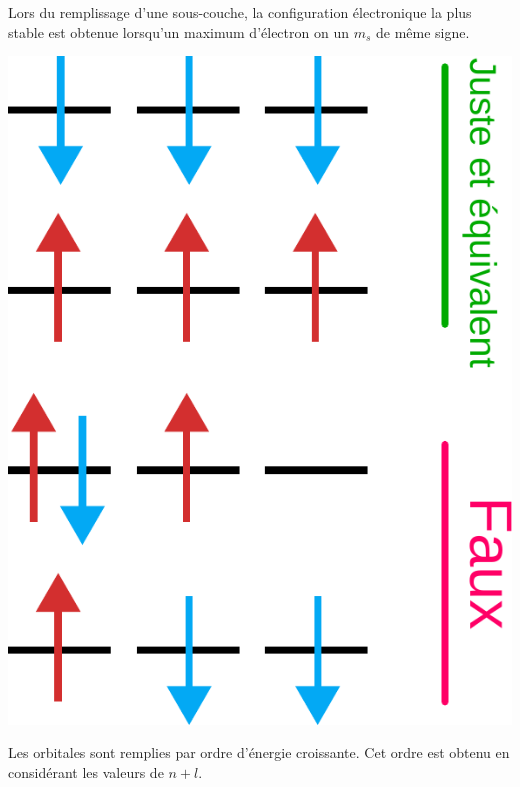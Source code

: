 \documentclass[french]{yLectureNote}
\begin{document}
\begin{multicols}{2}
\begin{theorem}
Lors du remplissage d'une sous-couche, la configuration électronique la plus stable est obtenue lorsqu'un maximum d'électron on un $m_s$ de m\^eme signe.

\end{theorem}
 \columnbreak
\includegraphics[scale=0.3]{hund}
\end{multicols}
\begin{theorem}
Les orbitales sont remplies par ordre d'énergie croissante. Cet ordre est obtenu en considérant les valeurs de $n+l$.
\end{theorem}
\end{document}
